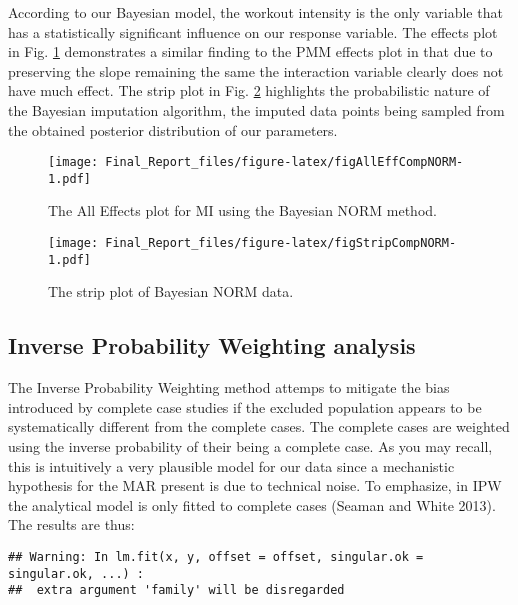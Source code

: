 \documentclass[]{article}
\theoremstyle{definition}
\theoremstyle{definition}
\theoremstyle{definition}
\theoremstyle{remark}
\begin{document}
According to our Bayesian model, the workout intensity is the only
variable that has a statistically significant influence on our response
variable. The effects plot in Fig. \ref{fig:AllEffCompNORM} demonstrates
a similar finding to the PMM effects plot in that due to preserving the
slope remaining the same the interaction variable clearly does not have
much effect. The strip plot in Fig. \ref{fig:StripCompNORM} highlights
the probabilistic nature of the Bayesian imputation algorithm, the
imputed data points being sampled from the obtained posterior
distribution of our parameters.

\begin{figure}[htbp]
\centering
\texttt{[image: Final\_Report\_files/figure-latex/figAllEffCompNORM-1.pdf]}
\caption{\label{fig:figAllEffCompNORM}\label{fig:AllEffCompNORM}The All
Effects plot for MI using the Bayesian NORM method.}
\end{figure}

\begin{figure}[htbp]
\centering
\texttt{[image: Final\_Report\_files/figure-latex/figStripCompNORM-1.pdf]}
\caption{\label{fig:figStripCompNORM}\label{fig:StripCompNORM}The strip plot
of Bayesian NORM data.}
\end{figure}

\subsection{Inverse Probability Weighting
analysis}\label{inverse-probability-weighting-analysis}

The Inverse Probability Weighting method attemps to mitigate the bias
introduced by complete case studies if the excluded population appears
to be systematically different from the complete cases. The complete
cases are weighted using the inverse probability of their being a
complete case. As you may recall, this is intuitively a very plausible
model for our data since a mechanistic hypothesis for the MAR present is
due to technical noise. To emphasize, in IPW the analytical model is
only fitted to complete cases (Seaman and White 2013). The results are
thus:

\begin{verbatim}
## Warning: In lm.fit(x, y, offset = offset, singular.ok = singular.ok, ...) :
##  extra argument 'family' will be disregarded
\end{verbatim}
\end{document}

